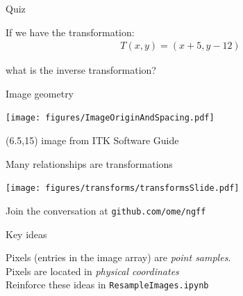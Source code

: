 \documentclass[aspectratio=169]{beamer}
\newcommand{\code}[1]{\texttt{#1}}
\newcommand\citefoot[1]{
    \begin{textblock}{12}(6.5,15)
        {\color{HHMIGrayB} \tiny #1}
    \end{textblock}
}
\newcommand\rightfoot[1]{
    \begin{textblock}{15}(0.5,13.7)
        {\color{gray} \scriptsize \hspace*{0pt}{\hfill} #1}
    \end{textblock}
}
\begin{document}
\begin{frame}{Quiz}

    If we have the transformation: \\
    \begin{align*}
        T( x, y ) = (x + 5, y - 12)
    \end{align*}

    what is the inverse transformation?
    

\end{frame}


\begin{frame}{Image geometry}
    \begin{center}
        \texttt{[image: figures/ImageOriginAndSpacing.pdf]}
    \end{center}
    \citefoot{image from ITK Software Guide}
\end{frame}


\begin{frame}{Many relationships are transformations}

    \vspace{0.7em}
    \begin{center}
      \texttt{[image: figures/transforms/transformsSlide.pdf]}
    \end{center}

    \vspace{-0.4em}Join the conversation at \code{github.com/ome/ngff}

\end{frame}


%
%
%


\begin{frame}{Key ideas}

    Pixels (entries in the image array) are \emph{point samples}. \\
    \vspace{1em}
    Pixels are located in \emph{physical coordinates} \\
    \vspace{2em}
    Reinforce these ideas in \code{ResampleImages.ipynb}

\end{frame}
\end{document}
